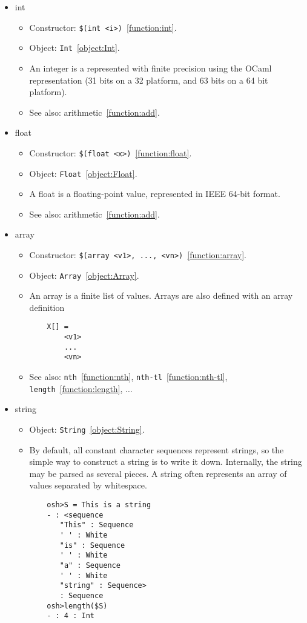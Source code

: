\begin{itemize}
\item int

\begin{itemize}
\item Constructor: \verb+$(int <i>)+~\ref{function:int}.
\item Object: \verb+Int+~\ref{object:Int}.
\item An integer is a represented with finite precision using the OCaml representation (31 bits on a
  32 platform, and 63 bits on a 64 bit platform).
\item See also: arithmetic~\ref{function:add}.
\end{itemize}

\item float

\begin{itemize}
\item Constructor: \verb+$(float <x>)+~\ref{function:float}.
\item Object: \verb+Float+~\ref{object:Float}.
\item A float is a floating-point value, represented in IEEE 64-bit format.
\item See also: arithmetic~\ref{function:add}.
\end{itemize}

\item array

\begin{itemize}
\item Constructor: \verb+$(array <v1>, ..., <vn>)+~\ref{function:array}.
\item Object: \verb+Array+~\ref{object:Array}.
\item An array is a finite list of values.
  Arrays are also defined with an array definition
\begin{verbatim}
    X[] =
        <v1>
        ...
        <vn>
\end{verbatim}
\item See also: \verb+nth+~\ref{function:nth}, \verb+nth-tl+~\ref{function:nth-tl},
  \verb+length+~\ref{function:length}, $\ldots$
\end{itemize}

\item string

\begin{itemize}
\item Object: \verb+String+~\ref{object:String}.
\item By default, all constant character sequences represent strings, so the simple way to construct
  a string is to write it down.  Internally, the string may be parsed as several pieces.
  A string often represents an array of values separated by whitespace.
\begin{verbatim}
    osh>S = This is a string
    - : <sequence
       "This" : Sequence
       ' ' : White
       "is" : Sequence
       ' ' : White
       "a" : Sequence
       ' ' : White
       "string" : Sequence>
       : Sequence
    osh>length($S)
    - : 4 : Int
\end{verbatim}


\end{itemize}
\end{itemize}

